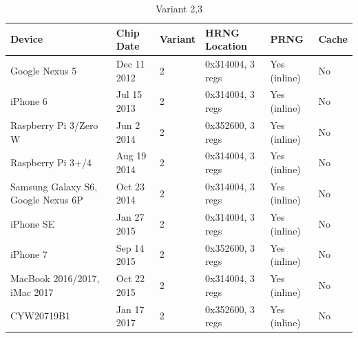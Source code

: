     \begin{table}[htb]
            \caption{Variant 2,3}	
            \begin{adjustbox}{width=\textwidth}

        \begin{tabular}{|l|l|l|l|l|l|}
            \hline
            \textbf{Device}                      & \textbf{Chip Date} & \textbf{Variant} & \textbf{HRNG Location} & \textbf{PRNG}                        & \textbf{Cache}                  \\ \hline
            Google   Nexus 5                     & Dec 11   2012      & 2                & 0x314004,   3 regs     & Yes   (inline)                       & No                              \\ \hline
            iPhone 6                             & Jul 15   2013      & 2                & 0x314004,   3 regs     & Yes   (inline)                       & No                              \\ \hline
            Raspberry   Pi 3/Zero W              & Jun 2 2014         & 2                & 0x352600,   3 regs     & Yes   (inline)                       & No                              \\ \hline
            Raspberry   Pi 3+/4                  & Aug 19   2014      & 2                & 0x314004,   3 regs     & Yes   (inline)                       & No                              \\ \hline
            Samsung   Galaxy S6, Google Nexus 6P & Oct 23   2014      & 2                & 0x314004,   3 regs     & Yes   (inline)                       & No                              \\ \hline
            iPhone SE                            & Jan 27   2015      & 2                & 0x314004,   3 regs     & Yes   (inline)                       & No                              \\ \hline
            iPhone 7                             & Sep 14   2015      & 2                & 0x352600,   3 regs     & Yes   (inline)                       & No                              \\ \hline
            MacBook   2016/2017, iMac 2017       & Oct 22   2015      & 2                & 0x314004,   3 regs     & Yes   (inline)                       & No                              \\ \hline
            CYW20719B1                           & Jan 17   2017      & 2                & 0x352600,   3 regs     & Yes   (inline)                       & No                              \\ \hline

\end{tabular}
\end{adjustbox}
\end{table}
